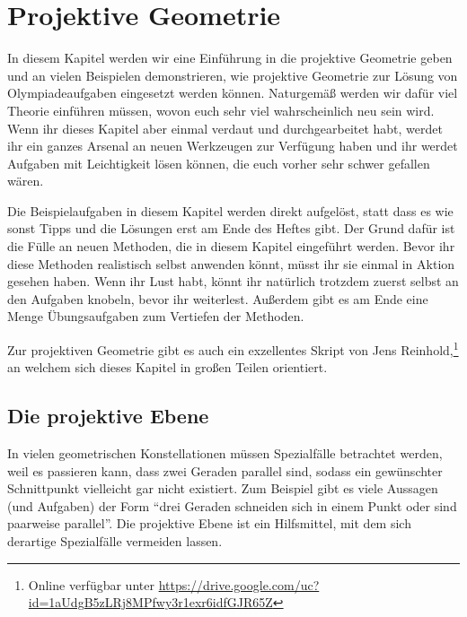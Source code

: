 \section{Projektive Geometrie}\label{kapitel:ProjektiveGeometrie}
In diesem Kapitel werden wir eine Einführung in die projektive Geometrie geben und an vielen Beispielen demonstrieren, wie projektive Geometrie zur Lösung von Olympiadeaufgaben eingesetzt werden können. Naturgemäß werden wir dafür viel Theorie einführen müssen, wovon euch sehr viel wahrscheinlich neu sein wird. Wenn ihr dieses Kapitel aber einmal verdaut und durchgearbeitet habt, werdet ihr ein ganzes Arsenal an neuen Werkzeugen zur Verfügung haben und ihr werdet Aufgaben mit Leichtigkeit lösen können, die euch vorher sehr schwer gefallen wären.

Die Beispielaufgaben in diesem Kapitel werden direkt aufgelöst, statt dass es wie sonst Tipps und die Lösungen erst am Ende des Heftes gibt. Der Grund dafür ist die Fülle an neuen Methoden, die in diesem Kapitel eingeführt werden. Bevor ihr diese Methoden realistisch selbst anwenden könnt, müsst ihr sie einmal in Aktion gesehen haben. Wenn ihr Lust habt, könnt ihr natürlich trotzdem zuerst selbst an den Aufgaben knobeln, bevor ihr weiterlest. Außerdem gibt es am Ende eine Menge Übungsaufgaben zum Vertiefen der Methoden.

Zur projektiven Geometrie gibt es auch ein exzellentes Skript von Jens Reinhold,\footnote{Online verfügbar unter \url{https://drive.google.com/uc?id=1aUdgB5zLRj8MPfwy3r1exr6idfGJR65Z}} an welchem sich dieses Kapitel in großen Teilen orientiert.

\subsection*{Die projektive Ebene}
In vielen geometrischen Konstellationen müssen Spezialfälle betrachtet werden, weil es passieren kann, dass zwei Geraden parallel sind, sodass ein gewünschter Schnittpunkt vielleicht gar nicht existiert. Zum Beispiel gibt es viele Aussagen (und Aufgaben) der Form \enquote{drei Geraden schneiden sich in einem Punkt oder sind paarweise parallel}. Die projektive Ebene ist ein Hilfsmittel, mit dem sich derartige Spezialfälle vermeiden lassen.

